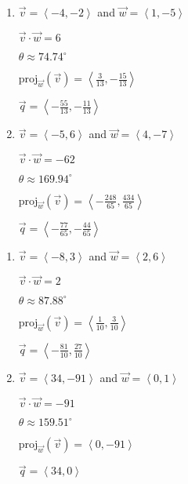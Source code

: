  
 
\begin{multicols}{2} \raggedcolumns 
\begin{enumerate}
\setcounter{enumi}{\value{HW}}


\item $\vec{v} = \left\langle -4, -2 \right\rangle$ and $\vec{w} = \left\langle 1, -5 \right\rangle$

 $\vec{v} \cdot \vec{w} = 6$

 $\theta \approx  74.74^{\circ}$ 

 $\text{proj}_{\vec{w}}(\vec{v}) = \left\langle \frac{3}{13}, -\frac{15}{13} \right\rangle$

 $\vec{q} = \left\langle -\frac{55}{13}, -\frac{11}{13} \right\rangle$

\vfill

\item $\vec{v} = \left\langle -5, 6 \right\rangle$ and $\vec{w} = \left\langle 4, -7 \right\rangle$

 $\vec{v} \cdot \vec{w} = -62$

 $\theta  \approx  169.94^{\circ}$ 

 $\text{proj}_{\vec{w}}(\vec{v}) = \left\langle -\frac{248}{65}, \frac{434}{65} \right\rangle$

 $\vec{q} = \left\langle -\frac{77}{65}, -\frac{44}{65} \right\rangle$
 
\setcounter{HW}{\value{enumi}}
\end{enumerate}
\end{multicols}
 
 
\pagebreak
 
 
 
\begin{multicols}{2} \raggedcolumns 
\begin{enumerate}
\setcounter{enumi}{\value{HW}}


\item $\vec{v} = \left\langle -8, 3 \right\rangle$ and $\vec{w} = \left\langle 2, 6 \right\rangle$

 $\vec{v} \cdot \vec{w} = 2$

 $\theta \approx 87.88^{\circ}$ 

 $\text{proj}_{\vec{w}}(\vec{v}) = \left\langle \frac{1}{10}, \frac{3}{10} \right\rangle$

 $\vec{q} = \left\langle -\frac{81}{10}, \frac{27}{10} \right\rangle$

\vfill

\item $\vec{v} = \left\langle 34, -91 \right\rangle$ and $\vec{w} = \left\langle 0, 1 \right\rangle$

 $\vec{v} \cdot \vec{w} = -91$

 $\theta \approx  159.51^{\circ}$ 

 $\text{proj}_{\vec{w}}(\vec{v}) = \left\langle 0, -91 \right\rangle$

 $\vec{q} = \left\langle 34, 0 \right\rangle$
 
\setcounter{HW}{\value{enumi}}
\end{enumerate}
\end{multicols}



